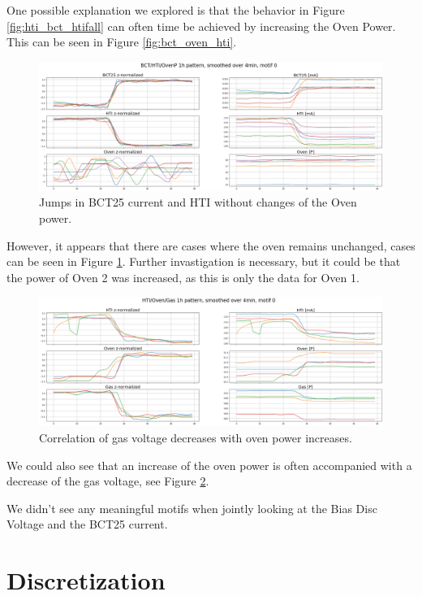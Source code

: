 \documentclass[12pt,a4paper]{article}
\begin{document}
One possible explanation we explored is that the behavior in Figure \ref{fig:hti_bct_htifall} can often time be achieved by increasing the Oven Power. This can be seen in Figure \ref{fig:bct_oven_hti}.

\begin{figure}
\centering
\includegraphics{images/bct_oven_hti_2dim.png}
\caption{Jumps in BCT25 current and HTI without changes of the Oven power.}
\label{fig:bct_oven_hti_2dim}
\end{figure}

However, it appears that there are cases where the oven remains unchanged, cases can be seen in Figure \ref{fig:bct_oven_hti_2dim}. Further invastigation is necessary, but it could be that the
power of Oven 2 was increased, as this is only the data for Oven 1.

\begin{figure}
\centering
\includegraphics{images/gas_oven_hti.png}
\caption{Correlation of gas voltage decreases with oven power increases.}
\label{fig:gas_oven_hti}
\end{figure}

We could also see that an increase of the oven power is often accompanied with a decrease of the gas voltage, see Figure \ref{fig:gas_oven_hti}.

We didn't see any meaningful motifs when jointly looking at the Bias Disc Voltage and the BCT25 current.

\hypertarget{discretization}{%
\section{Discretization}\label{discretization}}
\end{document}

